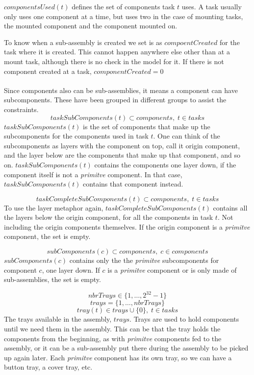  $componentsUsed(t)$ defines the set of components task $t$ uses. A task usually only uses one component at a time, but uses two in the case of mounting tasks, the mounted component and the component mounted on.
 
 To know when a sub-assembly is created we set is as $compoentCreated$ for the task where it is created. This cannot happen anywhere else other than at a mount task, although there is no check in the model for it. If there is not component created at a task, $componentCreated=0$
 \\\\
 Since components also can be sub-assemblies, it means a component can have subcomponents. These have been grouped in different groups to assist the constraints.
 \begin{equation}\label{eq:53}
 taskSubComponents(t) \subset components, \; t \in tasks
 \end{equation}
 $taskSubComponents(t)$ is the set of components that make up the subcomponents for the components used in task $t$. One can think of the subcomponents as layers with the component on top, call it origin component, and the layer below are the components that make up that component, and so on. $taskSubComponents(t)$ contains the components one layer down, if the component itself is not a \emph{primitve} component. In that case, $taskSubComponents(t)$ contains that component instead.
 
 \begin{equation}\label{eq:54}
 taskCompleteSubComponents(t) \subset components, \; t \in tasks
 \end{equation}
 To use the layer metaphor again, $taskCompleteSubComponents(t)$ contains all the layers below the origin component, for all the components in task $t$. Not including the origin components themselves. If the origin component is a \emph{primitve} component, the set is empty.
 
 \begin{equation}\label{eq:55}
 subComponents(c) \subset components, \; c \in components
 \end{equation}
 $subComponents(c)$ contains only the the \emph{primitve} subcomponents for component $c$, one layer down. If $c$ is a \emph{primitve} component or is only made of sub-assemblies, the set is empty.
 
 \begin{equation}\label{eq:4}
 nbrTrays \in \{1 , \ldots , 2^{32}-1\}
 \end{equation}
 \begin{equation}\label{eq:14}
 trays = \{1 , \ldots , nbrTrays\}
 \end{equation}
 \begin{equation}\label{eq:22}
 tray(t) \in trays \cup \{0\}, \; t \in tasks
 \end{equation}
 The trays available in the assembly, $trays$. Trays are used to hold components until we need them in the assembly. This can be that the tray holds the components from the beginning, as with \emph{primitve} components fed to the assembly, or it can be a sub-assembly put there during the assembly to be picked up again later. Each \emph{primitve} component has its own tray, so we can have a button tray, a cover tray, etc.
 
